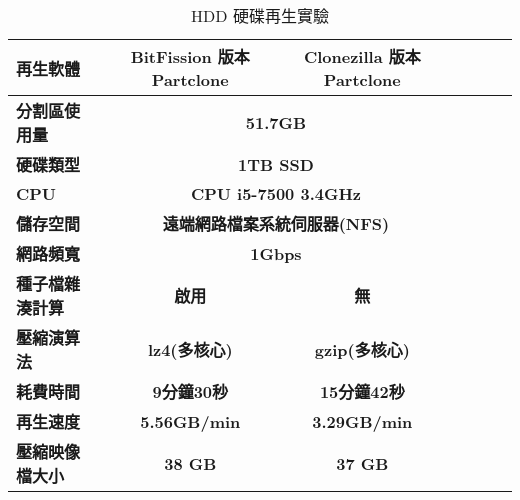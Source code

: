 \begin{table}[!htbp]
\centering
\caption{HDD 硬碟再生實驗}
\label{imaging_hdd}
\begin{adjustbox}{max width=0.92\textwidth}
\begin{tabular}{lcccccc}

\toprule
\multicolumn{1}{l}{\textbf{再生軟體}} & \textbf{BitFission 版本 Partclone} & \textbf{Clonezilla 版本 Partclone} \\ \midrule
\multicolumn{1}{l}{\textbf{分割區使用量}} & \multicolumn{2}{c}{\textbf{51.7GB}} \\

\multicolumn{1}{l}{\textbf{硬碟類型}} & \multicolumn{2}{c}{\textbf{1TB SSD}} \\

\multicolumn{1}{l}{\textbf{CPU}} & \multicolumn{2}{c}{\textbf{CPU i5-7500 3.4GHz}} \\

\multicolumn{1}{l}{\textbf{儲存空間}} & \multicolumn{2}{c}{\textbf{遠端網路檔案系統伺服器(NFS)}} \\

\multicolumn{1}{l}{\textbf{網路頻寬}} & \multicolumn{2}{c}{\textbf{1Gbps}} \\

\multicolumn{1}{l}{\textbf{種子檔雜湊計算}} & \textbf{啟用} & \textbf{無} \\

\multicolumn{1}{l}{\textbf{壓縮演算法}} & \textbf{lz4(多核心)} & \textbf{gzip(多核心)} \\

\multicolumn{1}{l}{\textbf{耗費時間}} & \textbf{9分鐘30秒} & \textbf{15分鐘42秒} \\

\multicolumn{1}{l}{\textbf{再生速度}} & \textbf{5.56GB/min} & \textbf{3.29GB/min} \\

\multicolumn{1}{l}{\textbf{壓縮映像檔大小}} & \textbf{38 GB} & \textbf{37 GB} \\

\bottomrule
\end{tabular}
\end{adjustbox}
\end{table}

